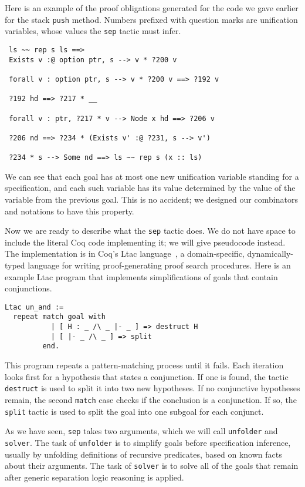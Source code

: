 \documentclass[preprint,nocopyrightspace]{sigplanconf}
\newcommand{\cd}[1]{\texttt{#1}}
\begin{document}
Here is an example of the proof obligations generated for the code we gave earlier for the stack \cd{push} method.  Numbers prefixed with question marks are unification variables, whose values the \cd{sep} tactic must infer.

\begin{verbatim}
 ls ~~ rep s ls ==>
 Exists v :@ option ptr, s --> v * ?200 v

 forall v : option ptr, s --> v * ?200 v ==> ?192 v

 ?192 hd ==> ?217 * __

 forall v : ptr, ?217 * v --> Node x hd ==> ?206 v

 ?206 nd ==> ?234 * (Exists v' :@ ?231, s --> v')

 ?234 * s --> Some nd ==> ls ~~ rep s (x :: ls)
\end{verbatim}

We can see that each goal has at most one new unification variable standing for a specification, and each such variable has its value determined by the value of the variable from the previous goal.  This is no accident; we designed our combinators and notations to have this property.

Now we are ready to describe what the \cd{sep} tactic does.  We do not have space to include the literal Coq code implementing it; we will give pseudocode instead.  The implementation is in Coq's Ltac language~\cite{Ltac}, a domain-specific, dynamically-typed language for writing proof-generating proof search procedures.  Here is an example Ltac program that implements simplifications of goals that contain conjunctions.

\begin{verbatim}
Ltac un_and :=
  repeat match goal with
           | [ H : _ /\ _ |- _ ] => destruct H
           | [ |- _ /\ _ ] => split
         end.
\end{verbatim}

This program repeats a pattern-matching process until it fails.  Each iteration looks first for a hypothesis that states a conjunction.  If one is found, the tactic \cd{destruct} is used to split it into two new hypotheses.  If no conjunctive hypotheses remain, the second \cd{match} case checks if the conclusion is a conjunction.  If so, the \cd{split} tactic is used to split the goal into one subgoal for each conjunct.

\medskip

As we have seen, \cd{sep} takes two arguments, which we will call \cd{unfolder} and \cd{solver}.  The task of \cd{unfolder} is to simplify goals before specification inference, usually by unfolding definitions of recursive predicates, based on known facts about their arguments.  The task of \cd{solver} is to solve all of the goals that remain after generic separation logic reasoning is applied.
\end{document}
